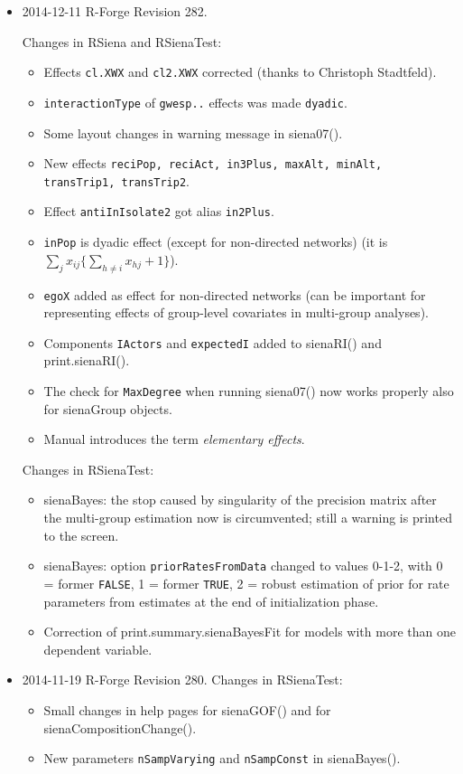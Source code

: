 \documentclass[a4paper,fleqn,11pt]{article}
\newcommand{\+}{\, + \,}
\newcommand{\sfn}[1]{\textsf{#1}}
\begin{document}
\begin{small}
\begin{itemize}
\item 2014-12-11 R-Forge Revision 282.

Changes in RSiena and RSienaTest:
\begin{itemize}
   \item Effects \texttt{cl.XWX} and \texttt{cl2.XWX} corrected (thanks to Christoph Stadtfeld).
   \item \texttt{interactionType} of \texttt{gwesp..} effects was made \texttt{dyadic}.
   \item Some layout changes in warning message in \sfn{siena07()}.
   \item New effects \texttt{reciPop, reciAct, in3Plus, maxAlt, minAlt, transTrip1, transTrip2}.
   \item Effect \texttt{antiInIsolate2} got alias \texttt{in2Plus}.
   \item \texttt{inPop} is dyadic effect (except for non-directed networks)
     (it is $\sum_j x_{ij} \{\sum_{h \neq i} x_{hj} + 1\}$).
   \item \texttt{egoX} added as effect for non-directed networks
     (can be important for representing effects of group-level covariates
     in multi-group analyses).
   \item Components \texttt{IActors} and \texttt{expectedI} added to \sfn{sienaRI()}
     and \sfn{print.sienaRI()}.
   \item The check for \texttt{MaxDegree} when running \sfn{siena07()} now works properly also
     for \sfn{sienaGroup} objects.
   \item Manual introduces the term \emph{elementary effects}.
\end{itemize}
Changes in RSienaTest:
\begin{itemize}
   \item \sfn{sienaBayes}: the stop caused by singularity of the precision
     matrix after the multi-group estimation now is circumvented;
	 still a warning is printed to the screen.
  \item \sfn{sienaBayes:} option \texttt{priorRatesFromData} changed to values 0-1-2,
     with 0 = former \texttt{FALSE}, 1 = former \texttt{TRUE}, 2 = robust estimation of prior
     for rate parameters from estimates at the end of initialization phase.
  \item Correction of \sfn{print.summary.sienaBayesFit} for models
     with more than one dependent variable.
\end{itemize}

\item 2014-11-19   R-Forge Revision 280.
Changes in RSienaTest:
\begin{itemize}
\item Small changes in help pages for \sfn{sienaGOF()} and for \sfn{sienaCompositionChange()}.
\item New parameters \texttt{nSampVarying} and \texttt{nSampConst} in \sfn{sienaBayes()}.
\end{itemize}


\end{itemize}
\end{small}
\end{document}
